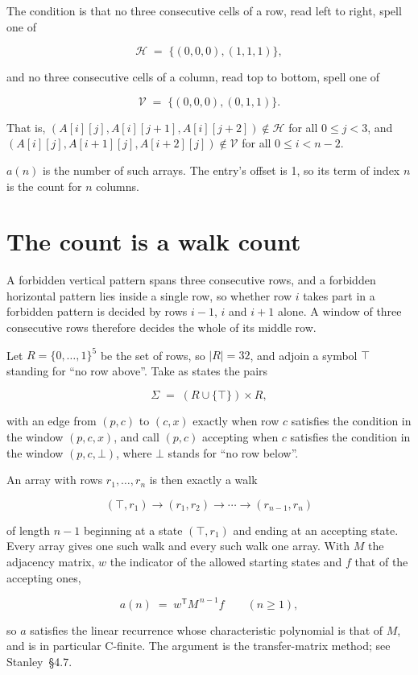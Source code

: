 \documentclass[11pt]{article}
\theoremstyle{definition}
\begin{document}
The condition is that no three consecutive cells of a row, read left to right, spell one of

\[\mathcal{H} \;=\; \{(0,0,0), (1,1,1)\},\]

and no three consecutive cells of a column, read top to bottom, spell one of

\[\mathcal{V} \;=\; \{(0,0,0), (0,1,1)\}.\]

That is, $(A[i][j],A[i][j{+}1],A[i][j{+}2]) \notin \mathcal{H}$ for all $0 \le j < 3$, and $(A[i][j],A[i{+}1][j],A[i{+}2][j]) \notin \mathcal{V}$ for all $0 \le i < n-2$.

$a(n)$ is the number of such arrays. The entry's offset is 1, so its term of index $n$ is the count for $n$ columns.

\section{The count is a walk count}

A forbidden vertical pattern spans three consecutive rows, and a forbidden horizontal pattern lies inside a single row, so whether row $i$ takes part in a forbidden pattern is decided by rows $i-1$, $i$ and $i+1$ alone. A window of three consecutive rows therefore decides the whole of its middle row.

Let $R = \{0,\dots,1\}^{5}$ be the set of rows, so $|R| = 32$, and adjoin a symbol $\top$ standing for ``no row above''. Take as states the pairs

\[\Sigma \;=\; (R \cup \{\top\}) \times R,\]

with an edge from $(p,c)$ to $(c,x)$ exactly when row $c$ satisfies the condition in the window $(p,c,x)$, and call $(p,c)$ accepting when $c$ satisfies the condition in the window $(p,c,\bot)$, where $\bot$ stands for ``no row below''.

An array with rows $r_1,\dots,r_n$ is then exactly a walk

\[(\top,r_1) \to (r_1,r_2) \to \cdots \to (r_{n-1},r_n)\]

of length $n-1$ beginning at a state $(\top,r_1)$ and ending at an accepting state. Every array gives one such walk and every such walk one array. With $M$ the adjacency matrix, $w$ the indicator of the allowed starting states and $f$ that of the accepting ones,

\[a(n) \;=\; w^{\mathsf T} M^{\,n-1} f \qquad (n \ge 1),\]

so $a$ satisfies the linear recurrence whose characteristic polynomial is that of $M$, and is in particular C-finite. The argument is the transfer-matrix method; see Stanley~\S4.7.
\end{document}
